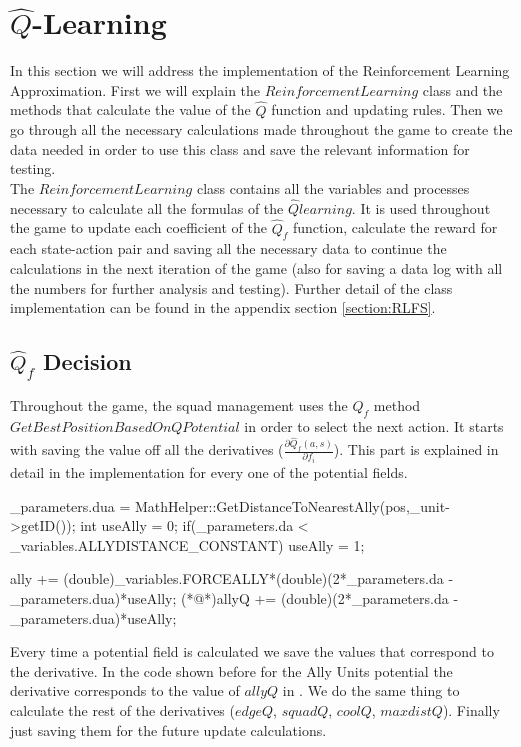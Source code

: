 \newpage
\section{$ \hat{Q}$-Learning}\label{section:reinforcement}
In this section we will address the implementation of the Reinforcement Learning Approximation. First we will explain the $ReinforcementLearning$ class and the methods that calculate the value of the $\hat{Q}$ function and updating rules. Then we go through all the necessary calculations made throughout the game to create the data needed in order to use this class and save the relevant information for testing.\\

The $ReinforcementLearning$ class contains all the variables and processes necessary to calculate all the formulas of the $\hat{Q} learning$. It is used throughout the game to update each coefficient of the $\hat{Q}_f$ function, calculate the reward for each state-action pair and saving all the necessary data to continue the calculations in the next iteration of the game (also for saving a data log with all the numbers for further analysis and testing). Further detail of the class implementation can be found in the appendix section \ref{section:RLFS}. 

\subsection{$\hat{Q}_f$ Decision} \label{rlMethods}

Throughout the game, the squad management uses the $\hat{Q}_f$ method \\
$GetBestPositionBasedOnQPotential$ in order to select the next action. It starts with saving the value off all the derivatives ($\frac{\partial \hat{Q}_f(a,s)}{\partial f_i}$). This part is explained in detail in the implementation for every one of the potential fields. \\

\begin{Sourcecode}[caption=Ally units]
_parameters.dua = MathHelper::GetDistanceToNearestAlly(pos,_unit->getID());
int useAlly = 0;
if(_parameters.da < _variables.ALLYDISTANCE_CONSTANT)
	useAlly = 1;

ally += (double)_variables.FORCEALLY*(double)(2*_parameters.da - _parameters.dua)*useAlly;
(*@\lnote@*)allyQ += (double)(2*_parameters.da - _parameters.dua)*useAlly;
\end{Sourcecode}	

Every time a potential field is calculated we save the values that correspond to the derivative. In the code shown before for the Ally Units potential the derivative corresponds to the value of $allyQ$ in . We do the same thing to calculate the rest of the derivatives ($edgeQ$, $squadQ$, $coolQ$, $maxdistQ$). Finally just saving them for the future update calculations.\\ 

